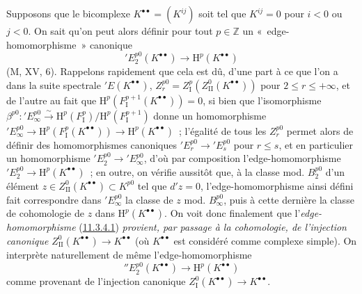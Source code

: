\begin{env}[11.3.4]
\label{0.11.3.4-fr}
Supposons que le bicomplexe $K^{\bullet\bullet}=(K^{ij})$ soit tel que
$K^{ij}=0$ pour $i<0$ ou $j<0$. On sait qu'on peut alors définir pour tout
$p\in\mathbb Z$ un «~edge-homomorphisme~» canonique
\[
\label{0.11.3.4.1-fr}
  'E_2^{p0}(K^{\bullet\bullet})\longrightarrow
  \mathrm H^p(K^{\bullet\bullet})
  \tag{11.3.4.1}
\]
(M, XV, 6). Rappelons rapidement que cela est dû, d'une part à ce que l'on a
dans la suite spectrale $'E(K^{\bullet\bullet})$,
$Z_r^{p0}=Z_{\mathrm I}^p(Z_{\mathrm{II}}^0(K^{\bullet\bullet}))$ pour
$2\leq r\leq+\infty$, et de l'autre au fait que
$\mathrm H^p(F_{\mathrm I}^{p+1}(K^{\bullet\bullet}))=0$, si bien que
l'isomorphisme
$\beta^{p0}:'E_\infty^{p0}\xrightarrow{\sim}
\mathrm H^p(F_{\mathrm I}^p)/\mathrm H^p(F_{\mathrm I}^{p+1})$ donne un
homomorphisme
$'E_\infty^{p0}\to\mathrm H^p(F_{\mathrm I}^p(K^{\bullet\bullet}))
\to\mathrm H^p(K^{\bullet\bullet})$~; l'égalité de tous les $Z_r^{p0}$ permet
alors de définir des homomorphismes canoniques
$'E_r^{p0}\to'E_s^{p0}$ pour $r\leq s$, et en particulier un homomorphisme
$'E_2^{p0}\to'E_\infty^{p0}$, d'où par composition l'edge-homomorphisme
$'E_2^{p0}\to\mathrm H^p(K^{\bullet\bullet})$~; en outre, on vérifie aussitôt
que, à la classe mod. $B_2^{p0}$ d'un élément
$z\in Z_{\mathrm{II}}^0(K^{\bullet\bullet})\subset K^{p0}$ tel que $d'z=0$,
l'edge-homomorphisme ainsi défini fait correspondre dans $'E_\infty^{p0}$ la
classe de $z$ mod. $B_\infty^{p0}$, puis à cette dernière la classe de
cohomologie de $z$ dans $\mathrm H^p(K^{\bullet\bullet})$. On voit donc
finalement que l'\emph{edge-homomorphisme}
(\hyperref[0.11.3.4.1-fr]{11.3.4.1}) \emph{provient, par passage à la cohomologie,
de l'injection canonique}
$Z_{\mathrm{II}}^0(K^{\bullet\bullet})\to K^{\bullet\bullet}$ (où
$K^{\bullet\bullet}$ est considéré comme complexe simple). On interprète
naturellement de même l'edge-homomorphisme
\[
\label{0.11.3.4.2-fr}
  ''E_2^{p0}(K^{\bullet\bullet})\longrightarrow
  \mathrm H^p(K^{\bullet\bullet})
  \tag{11.3.4.2}
\]
comme provenant de l'injection canonique
$Z_{\mathrm I}^0(K^{\bullet\bullet})\to K^{\bullet\bullet}$.
\end{env}

